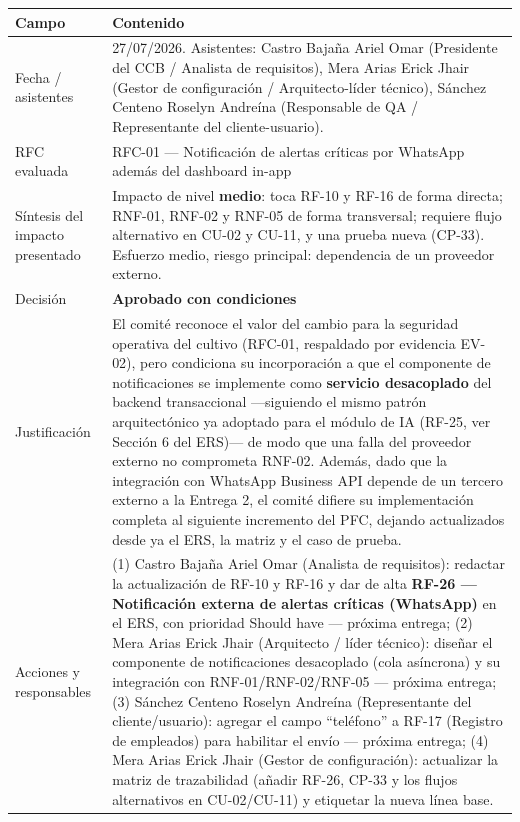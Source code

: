 \documentclass[11pt,a4paper]{article}
\begin{document}
\begin{longtable}{|p{4.5cm}|p{10cm}|}
\hline
\textbf{Campo} & \textbf{Contenido} \\ \hline
\endhead
Fecha / asistentes &
27/07/2026. Asistentes: Castro Bajaña Ariel Omar (Presidente del CCB / Analista de requisitos), Mera Arias Erick Jhair (Gestor de configuración / Arquitecto-líder técnico), Sánchez Centeno Roselyn Andreína (Responsable de QA / Representante del cliente-usuario). \\ \hline
RFC evaluada & RFC-01 — Notificación de alertas críticas por WhatsApp además del dashboard in-app \\ \hline
Síntesis del impacto presentado & Impacto de nivel \textbf{medio}: toca RF-10 y RF-16 de forma directa; RNF-01, RNF-02 y RNF-05 de forma transversal; requiere flujo alternativo en CU-02 y CU-11, y una prueba nueva (CP-33). Esfuerzo medio, riesgo principal: dependencia de un proveedor externo. \\ \hline
Decisión & \textbf{Aprobado con condiciones} \\ \hline
Justificación & El comité reconoce el valor del cambio para la seguridad operativa del cultivo (RFC-01, respaldado por evidencia EV-02), pero condiciona su incorporación a que el componente de notificaciones se implemente como \textbf{servicio desacoplado} del backend transaccional —siguiendo el mismo patrón arquitectónico ya adoptado para el módulo de IA (RF-25, ver Sección 6 del ERS)— de modo que una falla del proveedor externo no comprometa RNF-02. Además, dado que la integración con WhatsApp Business API depende de un tercero externo a la Entrega 2, el comité difiere su implementación completa al siguiente incremento del PFC, dejando actualizados desde ya el ERS, la matriz y el caso de prueba. \\ \hline
Acciones y responsables &
(1) Castro Bajaña Ariel Omar (Analista de requisitos): redactar la actualización de RF-10 y RF-16 y dar de alta \textbf{RF-26 — Notificación externa de alertas críticas (WhatsApp)} en el ERS, con prioridad Should have — próxima entrega;
(2) Mera Arias Erick Jhair (Arquitecto / líder técnico): diseñar el componente de notificaciones desacoplado (cola asíncrona) y su integración con RNF-01/RNF-02/RNF-05 — próxima entrega;
(3) Sánchez Centeno Roselyn Andreína (Representante del cliente/usuario): agregar el campo ``teléfono'' a RF-17 (Registro de empleados) para habilitar el envío — próxima entrega;
(4) Mera Arias Erick Jhair (Gestor de configuración): actualizar la matriz de trazabilidad (añadir RF-26, CP-33 y los flujos alternativos en CU-02/CU-11) y etiquetar la nueva línea base. \\ \hline

\end{longtable}
\end{document}
